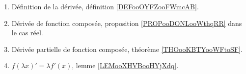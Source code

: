 
\begin{enumerate}
	\item
	      Définition de la dérivée, définition \ref{DEFooOYFZooFWmcAB}.
	\item
	      Dérivée de fonction composée, proposition \ref{PROPooDONLooWthqRR} dans le cas réel.
	\item
	      Dérivée partielle de fonction composée, théorème \ref{THOooKBTYooWFtoSF}.
	\item
	      \( f(\lambda x)'=\lambda f'(x)\), lemme \ref{LEMooXHVBooHYjXdq}.
\end{enumerate}

